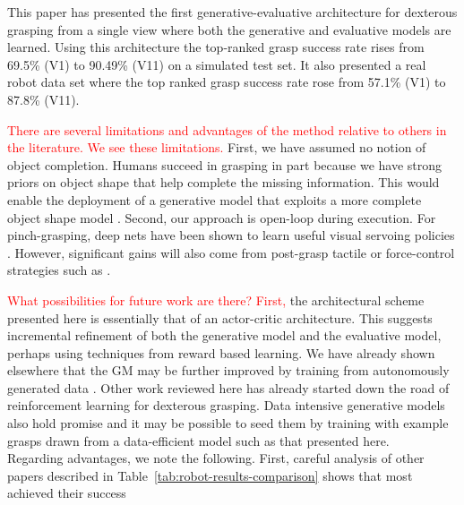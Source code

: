 This paper has presented the first generative-evaluative architecture for dexterous grasping from a single view where both the generative and evaluative models are learned. Using this architecture the top-ranked grasp success rate rises from 69.5\% (V1) to 90.49\% (V11) on a simulated test set. It also presented a real robot data set where the top ranked grasp success rate rose from 57.1\% (V1) to 87.8\% (V11).

\textcolor{red}{There are several limitations and advantages of the method relative to others in the literature. We see these limitations.} First, we have assumed no notion of object completion. Humans succeed in grasping in part because we have strong priors on object shape that help complete the missing information. This would enable the deployment of a generative model that exploits a more complete object shape model \cite{kopicki2015ijrr}. Second, our approach is open-loop during execution. For pinch-grasping, deep nets have been shown to learn useful visual servoing policies \cite{morrison18}. However, significant gains will also come from post-grasp tactile or force-control strategies such as \cite{Torres2018}. 

\textcolor{red}{What possibilities for future work are there? First,} the architectural scheme presented here is essentially that of an actor-critic architecture. This suggests incremental refinement of both the generative model and the evaluative model, perhaps using techniques from reward based learning. We have already shown elsewhere that the GM may be further improved by training from autonomously generated data \cite{kopicki2019ijrr}. Other work reviewed here \cite{mandikal2021dexterous,Osa2018} has already started down the road of reinforcement learning for dexterous grasping. Data intensive generative models also hold promise \cite{veres2017modeling} and it may be possible to seed them by training with example grasps drawn from a data-efficient model such as that presented here.\\




Regarding advantages, we note the following. First,  careful analysis of other papers described in Table~\ref{tab:robot-results-comparison} shows that most achieved their success 